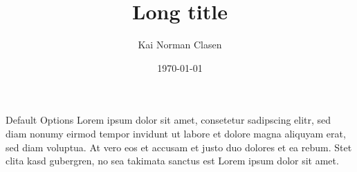 \documentclass[aspectratio=169]{beamer}
\title[Default Options]{Long title}
\author{Kai Norman Clasen}
\institute{}
\date{\today}
\begin{document}
  \begin{frame}{Default Options}
    Lorem ipsum dolor sit amet, consetetur sadipscing elitr, 
    sed diam nonumy eirmod tempor invidunt ut labore et dolore 
    magna aliquyam erat, sed diam voluptua. 
    At vero eos et accusam et justo duo dolores et ea rebum. 
    Stet clita kasd gubergren, no sea takimata sanctus est 
    Lorem ipsum dolor sit amet.
  \end{frame}
\end{document}
